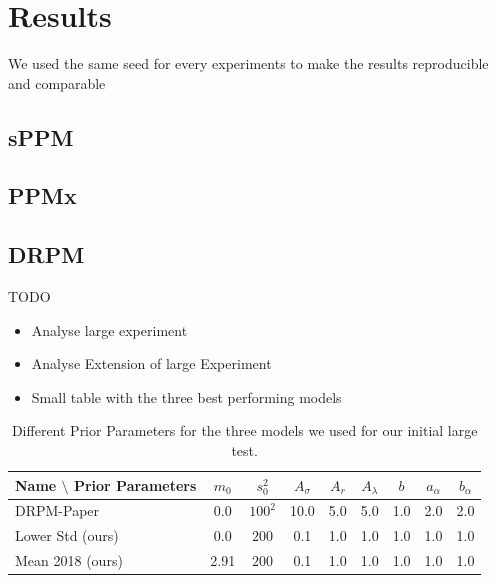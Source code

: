 \documentclass[12pt,a4paper]{article}
\begin{document}
\newpage

\section{Results}
We used the same seed for every experiments to make the results
reproducible and comparable
\subsection{sPPM}
\subsection{PPMx}
\subsection{DRPM}
TODO
\begin{itemize}
    \item Analyse large experiment
    \item Analyse Extension of large Experiment
    \item Small table with the three best performing models
\end{itemize}

\begin{table}[h]
\centering
\begin{tabular}{lcccccccc}
\toprule
Name $\setminus$ Prior Parameters & $m_0$ & $s_0^2$ & $A_\sigma$ & $A_r$ & $A_\lambda$ & $b$ & $a_\alpha$ & $b_\alpha$ \\
\midrule
DRPM-Paper \cite{Page2021-Temporal} & 0.0   & $100^2$ & 10.0         & 5.0     & 5.0           & 1.0   & 2.0        & 2.0        \\
Lower Std (ours)                                & 0.0   & $200$   & 0.1        & 1.0     & 1.0           & 1.0   & 1.0          & 1.0          \\
Mean 2018 (ours)                                & 2.91  & $200$  & 0.1        & 1.0     & 1.0           & 1.0   & 1.0          & 1.0         \\
\bottomrule
\end{tabular}
\caption{Different Prior Parameters for the three models we used for our initial large test.}
\label{tab:DRPMPriorParam}
\end{table}
\end{document}
